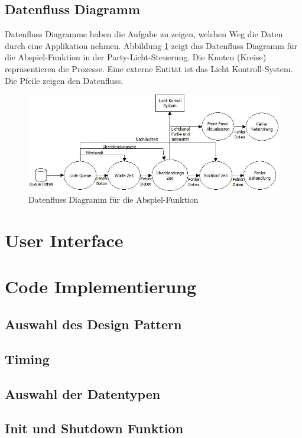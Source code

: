 \subsection{Datenfluss Diagramm}
Datenfluss Diagramme haben die Aufgabe zu zeigen, welchen Weg die Daten durch eine Applikation nehmen. Abbildung \ref{fig:plan02} zeigt das Datenfluss Diagramm für die Abspiel-Funktion in der Party-Licht-Steuerung. Die Knoten (Kreise) repräsentieren die Prozesse. Eine externe Entität ist das Licht Kontroll-System.  Die Pfeile zeigen den Datenfluss.
	\begin{figure}[h!]
	\centering
		\includegraphics[width=\textwidth]{Pics/play-dataflow.jpeg}
	\caption{Datenfluss Diagramm für die Abspiel-Funktion}
	\label{fig:plan02}
	\end{figure}	
		
\section{User Interface}

\section{Code Implementierung}
		\subsection{Auswahl des Design Pattern} %
		\subsection{Timing}
		\subsection{Auswahl der Datentypen}

		\subsection{Init und Shutdown Funktion}	%
